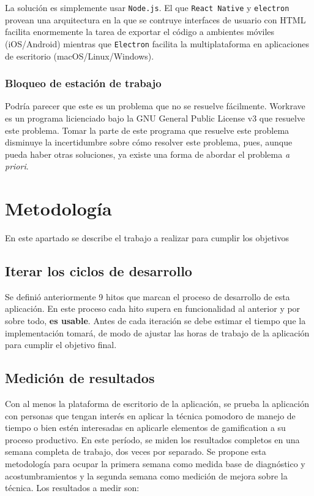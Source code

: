 \documentclass[12pt,letterpaper]{report}
\begin{document}
La solución es simplemente usar \texttt{Node.js}. El que \texttt{React Native}
y \texttt{electron} provean una arquitectura en la que se contruye interfaces
de usuario con HTML facilita enormemente la tarea de exportar el código a
ambientes móviles (iOS/Android) mientras que \texttt{Electron} facilita la
multiplataforma en aplicaciones de escritorio (macOS/Linux/Windows).

\subsubsection{Bloqueo de estación de trabajo}\label{bloqueo-de-estacion-de-trabajo}

Podría parecer que este es un problema que no se resuelve fácilmente. Workrave es un programa licienciado bajo la GNU
General Public License v3 que resuelve este problema. Tomar la parte de este programa que resuelve este problema
disminuye la incertidumbre sobre cómo resolver este problema, pues, aunque pueda haber otras soluciones, ya existe una
forma de abordar el problema \emph{a priori}.

\newpage
\hypertarget{metodologuxeda}{%
\section{Metodología}\label{metodologuxeda}}

En este apartado se describe el trabajo a realizar para cumplir los
objetivos

\hypertarget{iterar-los-ciclos-de-desarrollo}{%
\subsection{Iterar los ciclos de
desarrollo}\label{iterar-los-ciclos-de-desarrollo}}

Se definió anteriormente 9 hitos que marcan el proceso de desarrollo de esta aplicación. En este proceso cada hito
supera en funcionalidad al anterior y por sobre todo, \textbf{es usable}. Antes de cada iteración se debe estimar el
tiempo que la implementación tomará, de modo de ajustar las horas de trabajo de la aplicación para cumplir el objetivo
final.

\hypertarget{mediciuxf3n-de-resultados-1}{%
\subsection{Medición de resultados}\label{mediciuxf3n-de-resultados-1}}

Con al menos la plataforma de escritorio de la aplicación, se prueba la aplicación con personas que tengan interés en
aplicar la técnica pomodoro de manejo de tiempo o bien estén interesadas en aplicarle elementos de gamification a su
proceso productivo. En este período, se miden los resultados completos en una semana completa de trabajo, dos veces por
separado. Se propone esta metodología para ocupar la primera semana como medida base de diagnóstico y acostumbramientos
y la segunda semana como medición de mejora sobre la técnica. Los resultados a medir son:
\end{document}
